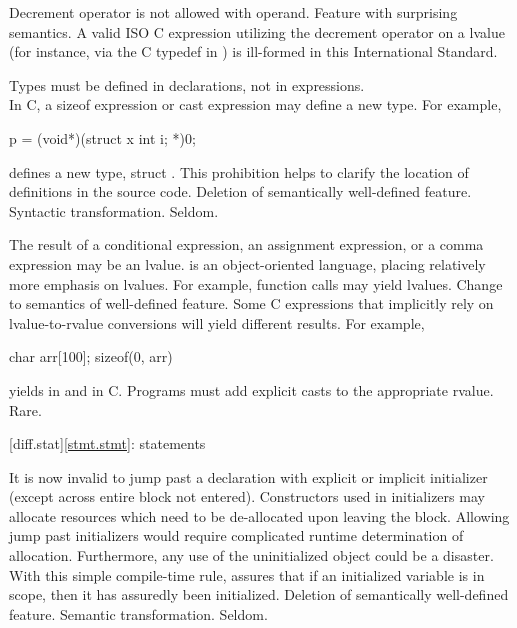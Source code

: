 \change
Decrement operator is not allowed with  operand.
\rationale Feature with surprising semantics.
\effect A valid ISO C expression utilizing the decrement operator on
a  lvalue (for instance, via the C typedef in )
is ill-formed in this International Standard.

\change Types must be defined in declarations, not in expressions.\\
In C, a sizeof expression or cast expression may define a new type.
For example,
\begin{codeblock}
p = (void*)(struct x {int i;} *)0;
\end{codeblock}
defines a new type, struct .
\rationale
This prohibition helps to clarify the location of
definitions in the source code.
\effect
Deletion of semantically well-defined feature.
\difficulty
Syntactic transformation.
\howwide
Seldom.

%
%
%
\change The result of a conditional expression, an assignment expression, or a comma expression may be an lvalue.
\rationale
\Cpp{} is an object-oriented language, placing relatively
more emphasis on lvalues.  For example, function calls may
yield lvalues.
\effect
Change to semantics of well-defined feature.  Some C
expressions that implicitly rely on lvalue-to-rvalue
conversions will yield different results.  For example,

\begin{codeblock}
char arr[100];
sizeof(0, arr)
\end{codeblock}

yields
in \Cpp{} and
in C.
\difficulty
Programs must add explicit casts to the appropriate rvalue.
\howwide
Rare.

[diff.stat]{\ref{stmt.stmt}: statements}

\change It is now invalid to jump past a declaration with explicit or implicit initializer (except across entire block not entered).
\rationale
Constructors used in initializers may allocate
resources which need to be de-allocated upon leaving the
block.
Allowing jump past initializers would require
complicated runtime determination of allocation.
Furthermore, any use of the uninitialized object could be a
disaster.
With this simple compile-time rule, \Cpp{} assures that
if an initialized variable is in scope, then it has assuredly been
initialized.
\effect
Deletion of semantically well-defined feature.
\difficulty
Semantic transformation.
\howwide
Seldom.

